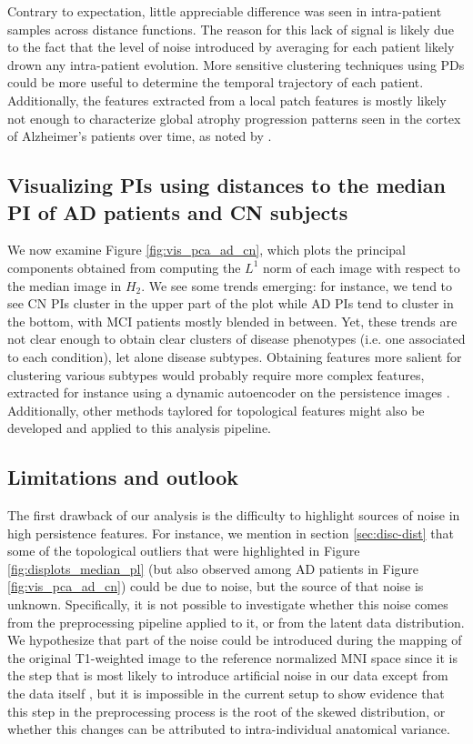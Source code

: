 \documentclass{article}
\begin{document}
Contrary to expectation, little appreciable difference was seen in intra-patient samples across
distance functions. The reason for this lack of signal is likely due to the fact that the level of
noise introduced by averaging for each patient likely drown any intra-patient evolution. More
sensitive clustering techniques using PDs could be more useful to determine the temporal trajectory
of each patient. Additionally, the features extracted from a local patch features is mostly likely
not enough to characterize global atrophy progression patterns seen in the cortex of Alzheimer's
patients over time, as noted by \citep{toniolo2018patterns}.

\subsection{Visualizing PIs using distances to the median PI of AD patients and CN subjects}

We now examine Figure \ref{fig:vis_pca_ad_cn}, which plots the principal components obtained from
computing the $L^1$ norm of each image with respect to the median image in $H_2$. We see some trends
emerging: for instance, we tend to see CN PIs cluster in the upper part of the plot while AD PIs
tend to cluster in the bottom, with MCI patients mostly blended in between. Yet, these trends are
not clear enough to obtain clear clusters of disease phenotypes (i.e. one associated to each
condition), let alone disease subtypes. Obtaining features more salient for clustering various
subtypes would probably require more complex features, extracted for instance using a dynamic
autoencoder on the persistence images \citep{mrabah2019deep}. Additionally, other methods taylored
for topological features might also be developed and applied to this analysis pipeline.

\subsection{Limitations and outlook}

The first drawback of our analysis is the difficulty to highlight sources of noise in high
persistence features. For instance, we mention in section \ref{sec:disc-dist} that some of the
topological outliers that were highlighted in Figure \ref{fig:displots_median_pl} (but also observed
among AD patients in Figure \ref{fig:vis_pca_ad_cn}) could be due to noise, but the source of that
noise is unknown. Specifically, it is not possible to investigate whether this noise comes from the
preprocessing pipeline applied to it, or from the latent data distribution. We hypothesize that part
of the noise could be introduced during the mapping of the original T1-weighted image to the
reference normalized MNI space since it is the step that is most likely to introduce artificial
noise in our data except from the data itself \citep{collins19943d}, but it is impossible in the
current setup to show evidence that this step in the preprocessing process is the root of the skewed
distribution, or whether this changes can be attributed to intra-individual anatomical variance.
\end{document}
